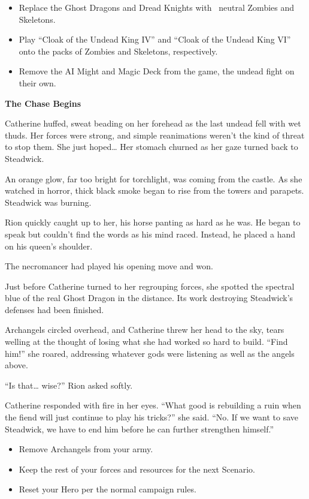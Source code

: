 \begin{multicols*}{2}
\begin{itemize}
  \item \textcolor{darkcandyapplered}{Replace the Ghost Dragons and Dread Knights with \bronze\ neutral Zombies and Skeletons.}
  \item \textcolor{darkcandyapplered}{Play ``Cloak of the Undead King IV'' and ``Cloak of the Undead King VI'' onto the packs of Zombies and Skeletons, respectively.}
  \item \textcolor{darkcandyapplered}{Remove the AI Might and Magic Deck from the game, the undead fight on their own.}
\end{itemize}


\textbf{The Chase Begins}

Catherine huffed, sweat beading on her forehead as the last undead fell with wet thuds.
Her forces were strong, and simple reanimations weren't the kind of threat to stop them.
She just hoped… Her stomach churned as her gaze turned back to Steadwick.

An orange glow, far too bright for torchlight, was coming from the castle.
As she watched in horror, thick black smoke began to rise from the towers and parapets.
Steadwick was burning.

Rion quickly caught up to her, his horse panting as hard as he was.
He began to speak but couldn't find the words as his mind raced.
Instead, he placed a hand on his queen's shoulder.

The necromancer had played his opening move and won.

Just before Catherine turned to her regrouping forces, she spotted the spectral blue of the real Ghost Dragon in the distance.
Its work destroying Steadwick's defenses had been finished.

Archangels circled overhead, and Catherine threw her head to the sky, tears welling at the thought of losing what she had worked so hard to build.
``Find him!'' she roared, addressing whatever gods were listening as well as the angels above.

``Is that… wise?'' Rion asked softly.

Catherine responded with fire in her eyes.
``What good is rebuilding a ruin when the fiend will just continue to play his tricks?'' she said.
``No.
If we want to save Steadwick, we have to end him before he can further strengthen himself.''

\begin{itemize}
  \item \textcolor{darkcandyapplered}{Remove Archangels from your army.}
  \item \textcolor{darkcandyapplered}{Keep the rest of your forces and resources for the next Scenario.}
  \item \textcolor{darkcandyapplered}{Reset your Hero per the normal campaign rules.}
\end{itemize}

\columnbreak

\begin{center}
\end{center}

\end{multicols*}
